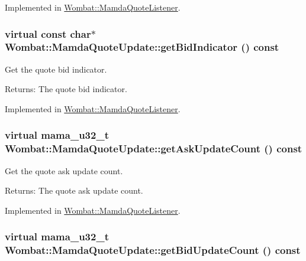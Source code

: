 Implemented in \hyperlink{classWombat_1_1MamdaQuoteListener_fac643c6fb9ad15e2d443d6a03304dfe}{Wombat::Mamda\-Quote\-Listener}.\hypertarget{classWombat_1_1MamdaQuoteUpdate_51cc4027f5eecfa772ae6535ccf6d0d9}{
\subsubsection[getBidIndicator]{\setlength{\rightskip}{0pt plus 5cm}virtual const char$\ast$ Wombat::Mamda\-Quote\-Update::get\-Bid\-Indicator () const}}
\label{classWombat_1_1MamdaQuoteUpdate_51cc4027f5eecfa772ae6535ccf6d0d9}


Get the quote bid indicator. 

\begin{Desc}
\item[Returns:]The quote bid indicator. \end{Desc}


Implemented in \hyperlink{classWombat_1_1MamdaQuoteListener_2ac1e2dabc677e93e414cf0c1d1fa94f}{Wombat::Mamda\-Quote\-Listener}.\hypertarget{classWombat_1_1MamdaQuoteUpdate_b204ad341a16a3da86e970b62bb41147}{
\subsubsection[getAskUpdateCount]{\setlength{\rightskip}{0pt plus 5cm}virtual mama\_\-u32\_\-t Wombat::Mamda\-Quote\-Update::get\-Ask\-Update\-Count () const}}
\label{classWombat_1_1MamdaQuoteUpdate_b204ad341a16a3da86e970b62bb41147}


Get the quote ask update count. 

\begin{Desc}
\item[Returns:]The quote ask update count. \end{Desc}


Implemented in \hyperlink{classWombat_1_1MamdaQuoteListener_f1cf490659772cef488d7207b3587958}{Wombat::Mamda\-Quote\-Listener}.\hypertarget{classWombat_1_1MamdaQuoteUpdate_579b4cc8bbff1cfd86af8c382df937d1}{
\subsubsection[getBidUpdateCount]{\setlength{\rightskip}{0pt plus 5cm}virtual mama\_\-u32\_\-t Wombat::Mamda\-Quote\-Update::get\-Bid\-Update\-Count () const}}
\label{classWombat_1_1MamdaQuoteUpdate_579b4cc8bbff1cfd86af8c382df937d1}


